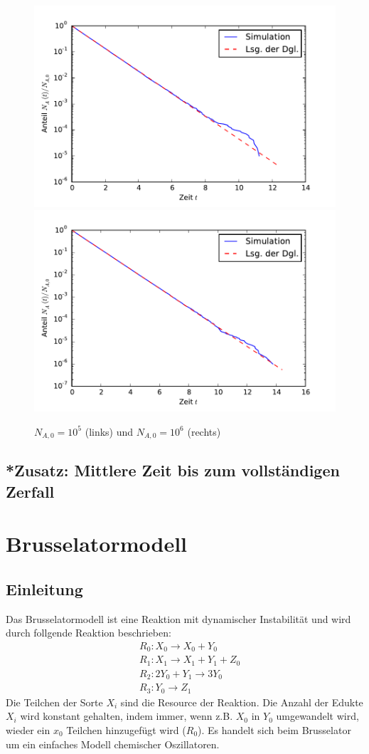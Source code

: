 \documentclass{scrartcl}
\begin{document}
\begin{minipage}{\textwidth}
\begin{figure}[H]
    \includegraphics[width=.475\textwidth]{A1n100000.pdf}
    \includegraphics[width=.475\textwidth]{A1n1000000.pdf}
    \caption{$N_{A, 0} = 10^5$ (links) und $N_{A, 0} = 10^6$ (rechts)}
\end{figure}
\end{minipage}

\subsection{*Zusatz: Mittlere Zeit bis zum vollständigen Zerfall}

\newpage

\section{Brusselatormodell}
\subsection{Einleitung}
Das Brusselatormodell ist eine Reaktion mit dynamischer Instabilität und wird durch follgende Reaktion beschrieben: 
\begin{align*}
    &~ R_0: X_0 \rightarrow X_0 + Y_0\\
    &~ R_1: X_1 \rightarrow X_1 + Y_1 + Z_0\\
    &~ R_2: 2Y_0 + Y_1 \rightarrow 3Y_0\\
    &~ R_3: Y_0 \rightarrow Z_1
\end{align*}
Die Teilchen der Sorte $X_i$ sind die Resource der Reaktion. Die Anzahl der Edukte $X_i$ wird konstant gehalten, indem immer, wenn z.B. $X_0$ in $Y_0$ umgewandelt wird, wieder ein $x_0$ Teilchen hinzugefügt wird ($R_0$). Es handelt sich beim Brusselator um ein einfaches Modell chemischer Oszillatoren.
\end{document}
